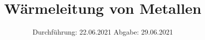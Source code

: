 

\subject{Versuch Nr.V204}
\title{Wärmeleitung von Metallen}
\date{%
  Durchführung: 22.06.2021
  \hspace{3em}
  Abgabe: 29.06.2021
}



\maketitle
\thispagestyle{empty}
\tableofcontents
\newpage 








\nocite{*}

\printbibliography{}


